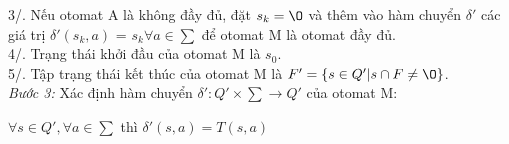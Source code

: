 \begin{flushleft}
\hspace{10mm}3/. Nếu otomat A là không đầy đủ, đặt $s_k = \O$ và thêm vào hàm chuyển $\delta'$ các giá trị $\delta'(s_k, a)$ = $s_k \forall a \in \sum$ để otomat M là otomat đầy đủ.\\
\hspace{10mm} 4/. Trạng thái khởi đầu của otomat M là $s_0$.\\
\hspace{10mm} 5/. Tập trạng thái kết thúc của otomat M là $F' = \{s \in Q' | s \cap F \ne \O \}$.\\
\textit{Bước 3:} Xác định hàm chuyển $\delta': Q' \times \sum \to Q'$ của otomat M:\\
\end{flushleft}
$\forall s \in Q', \forall a \in \sum $ thì $ \delta'(s, a) = T(s, a)$\\
